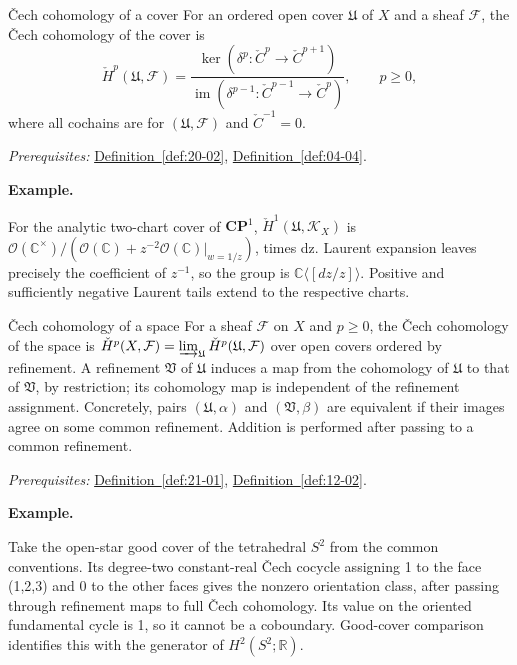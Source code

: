 \documentclass[11pt]{article}
\makeatletter
\newcommand{\R}{\mathbb R}
\newcommand{\C}{\mathbb C}
\newcounter{definition}
\newcommand{\CP}{\mathbf{CP}}
\newcommand{\exampleheading}{\par\medskip\textbf{Example.}\par\smallskip}
\newcommand{\currentdefinition}[1]{\protected@edef\@currentlabel{#1}}
\makeatother
\begin{document}
\begin{definitionbox}{\v{C}ech cohomology of a cover}
\currentdefinition{\thedefinition}
\label{def:21-01}
For an ordered open cover $\mathfrak U$ of $X$ and a sheaf $\mathcal F$, the \v Cech cohomology of the cover is
\[\check H^p(\mathfrak U,\mathcal F)=\frac{\ker(\delta^p:\check C^p\to\check C^{p+1})}{\operatorname{im}(\delta^{p-1}:\check C^{p-1}\to\check C^p)},\qquad p\ge0,\]
where all cochains are for $(\mathfrak U,\mathcal F)$ and $\check C^{-1}=0$.

\smallskip
\textit{Prerequisites:} \hyperref[def:20-02]{Definition~\ref*{def:20-02}}, \hyperref[def:04-04]{Definition~\ref*{def:04-04}}.

\exampleheading
For the analytic two-chart cover of $\CP^1$, $\check H^1(\mathfrak U,\mathcal K_X)$ is $\mathcal O(\C^\times)/(\mathcal O(\C)+z^{-2}\mathcal O(\C)\vert_{w=1/z})$, times dz. Laurent expansion leaves precisely the coefficient of $z^{-1}$, so the group is $\C\langle[dz/z]\rangle$. Positive and sufficiently negative Laurent tails extend to the respective charts.
\end{definitionbox}

\begin{definitionbox}{\v{C}ech cohomology of a space}
\currentdefinition{\thedefinition}
\label{def:21-02}
For a sheaf $\mathcal F$ on $X$ and $p\ge0$, the \v Cech cohomology of the space is $\check H^p(X,\mathcal F)=\varinjlim_{\mathfrak U}\check H^p(\mathfrak U,\mathcal F)$ over open covers ordered by refinement. A refinement $\mathfrak V$ of $\mathfrak U$ induces a map from the cohomology of $\mathfrak U$ to that of $\mathfrak V$, by restriction; its cohomology map is independent of the refinement assignment. Concretely, pairs $(\mathfrak U,\alpha)$ and $(\mathfrak V,\beta)$ are equivalent if their images agree on some common refinement. Addition is performed after passing to a common refinement.

\smallskip
\textit{Prerequisites:} \hyperref[def:21-01]{Definition~\ref*{def:21-01}}, \hyperref[def:12-02]{Definition~\ref*{def:12-02}}.

\exampleheading
Take the open-star good cover of the tetrahedral $S^2$ from the common conventions. Its degree-two constant-real \v{C}ech cocycle assigning 1 to the face (1,2,3) and 0 to the other faces gives the nonzero orientation class, after passing through refinement maps to full \v{C}ech cohomology. Its value on the oriented fundamental cycle is 1, so it cannot be a coboundary. Good-cover comparison identifies this with the generator of $H^2(S^2;\R)$.
\end{definitionbox}
\end{document}
